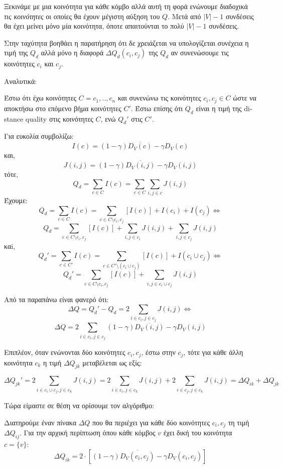 \documentclass[12pt, letterpaper]{article}
\begin{document}
Ξεκινάμε με μια κοινότητα για κάθε κόμβο αλλά αυτή τη φορά ενώνουμε διαδοχικά \emph{τις κοινότητες} οι οποίες θα έχουν μέγιστη αύξηση του $Q$. Μετά από $|V|-1$ συνδέσεις
θα έχει μείνει μόνο μία κοινότητα, όποτε απαιτούνται το πολύ $|V|-1$ συνδέσεις. 

Στην ταχύτητα βοηθάει η παρατήρηση ότι δε χρειάζεται να υπολογίζεται συνέχεια η τιμή της $Q_d$ αλλά μόνο η διαφορά $\Delta Q_d(c_i,c_j)$ της $Q_d$ αν συνενώσουμε τις 
κοινότητες $c_i$ και $c_j$. 


Αναλυτικά:

Έστω ότι έχω κοινότητες $C = {c_1,..,c_n}$ και συνενώνω τις κοινότητες $c_i,c_j \in C$ ώστε να αποκτήσω
στο επόμενο βήμα κοινότητες $C'$. Έστω επίσης ότι $Q_d$ είναι η τιμή της \textlatin{distance quality}
στις κοινότητες $C$, ενώ $Q_d'$ στις $C'$. 



Για ευκολία συμβολίζω: 
\[ I(c) = (1 - \gamma)\overline{ D_V(c) } - \gamma D_V(c) \]
και,
\[ J(i,j) = (1-\gamma) \overline{ D_V(i,j)} - \gamma D_V(i,j) \]
τότε,
\[ Q_d = \sum_{c \in C} I(c) =\sum_{c \in C} \sum_{i,j \in c} J(i,j) \]
Έχουμε:
\[ Q_d  = \sum_{c \in C} I(c) =  \sum_{c \in C \setminus c_i,c_j}[I(c)] + I(c_i) + I(c_j) \Leftrightarrow\]
\[ Q_d = \sum_{c \in C \setminus c_i,c_j}[I(c)] + \sum_{i,j \in c_i}J(i,j) + \sum_{i,j \in c_j}J(i,j)  \]
καi,
\[ Q_d' = \sum_{c \in C'} I(c) =  \sum_{c \in C' \setminus (c_i \cup c_j)}[I(c)] + I(c_i \cup c_j) \Leftrightarrow \]
\[ Q_d' =  \sum_{c \in C \setminus c_i,c_j}[I(c)] + \sum_{i,j \in c_i \cup c_j} J(i,j) \]



Από τα παραπάνω είναι φανερό ότι:
\[   \Delta Q = Q_d' - Q_d = 2 \sum_{i \in c_i, j \in c_j} J(i,j) \Leftrightarrow \]
\[ \Delta Q = 2 \sum_{i \in c_i, j \in c_j} (1-\gamma) \overline{ D_V(i,j)} - \gamma D_V(i,j) \]

\bigskip

Επιπλέον, όταν ενώνονται δύο κοινότητες $c_i,c_j$, έστω στην $c_j$, τότε για κάθε 
άλλη κοινότητα $c_k$ η τιμή $\Delta Q_{jk}$ μεταβέλεται ως εξίς:

\[ \Delta Q_{jk}' = 2 \sum_{i \in c_i \cup c_j, j \in c_k} J(i,j) = 2 \sum_{i \in c_i, j \in c_k} J(i,j) + 2 \sum_{i \in c_j, j \in c_k} J(i,j) = \Delta Q_{ik} + \Delta Q_{jk}\]


Τώρα είμαστε σε θέση να ορίσουμε τον αλγόριθμο:

Διατηρούμε έναν πίνακα $\Delta Q$ που θα περιέχει για κάθε δύο κοινότητες $c_i,c_j$ 
τη τιμή $\Delta Q_{ij}$. Για την αρχική περίπτωση όπου κάθε κόμβος $v$ έχει δική του 
κοινότητα $c=\{v\}$: 
\begin{equation}   \label{init_dq}
  \Delta Q_{ik} = 2 \cdot [(1-\gamma)\overline{ D_V(c_i,c_j)} - \gamma  D_V(c_i,c_j)   ]
\end{equation}
\end{document}
